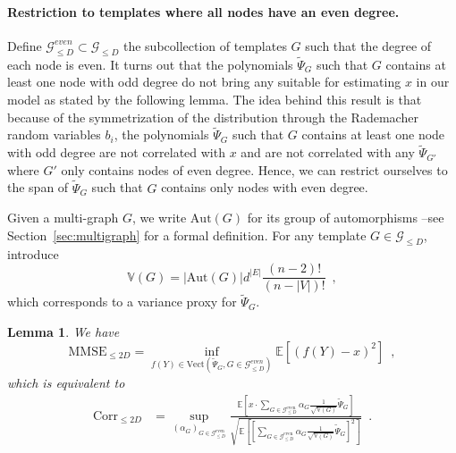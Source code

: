 \documentclass{article}
\newtheorem{lemma}{Lemma}
\begin{document}
\paragraph{Restriction to templates where all nodes have an even degree.}  


Define $\mathcal{G}_{\leq D}^{even}\subset \mathcal{G}_{\leq D}$ the subcollection of templates $G$ such that the degree of each  node is even. It turns out that the polynomials $\widetilde{\Psi}_{G}$ such that $G$ contains at least one node with odd degree do not bring any suitable for estimating $x$ in our model as stated by the following lemma. The idea behind this result is that because of the symmetrization of the distribution through the Rademacher random variables $b_i$, the polynomials $\widetilde{\Psi}_{G}$ such that $G$ contains at least one node with odd degree are not correlated with $x$ and are not correlated with any $\widetilde{\Psi}_{G'}$ where $G'$ only contains  nodes of even degree. Hence, we can restrict ourselves to the span of $\widetilde{\Psi}_{G}$ such that $G$ contains only nodes with even degree.

 Given a multi-graph $G$, we write $\mathrm{Aut}(G)$ for its group of automorphisms --see Section~\ref{sec:multigraph} for a formal definition. 
 For any template $G\in \mathcal{G}_{\leq D}$, introduce
\begin{equation}\label{eq:definition:V(G)}
\mathbb{V}(G)= |\mathrm{Aut}(G)| d^{|E|}\frac{(n-2)!}{(n-|V|)!}\enspace , 
\end{equation}
which corresponds to a variance proxy for $\widetilde{\Psi}_{G}$.


\begin{lemma}\label{lem:reduction:degree_pair}
We have 
\[
\mathrm{MMSE}_{\leq 2D}= \inf_{f(Y)\in \mathrm{Vect}(\widetilde{\Psi}_{G}, G \in \mathcal{G}_{\leq D}^{even})}\mathbb{E}[(f(Y)-x)^2]\enspace ,
\]
which is equivalent to
\begin{align*}
    \mathrm{Corr}_{\leq 2D} &= \sup_{(\alpha_G)_{G\in \mathcal G^{\mathrm{even}}_{\leq D}}} \frac{\mathbb E\left[x \cdot \sum_{G \in \mathcal G^{\mathrm{even}}_{\leq D}} \alpha_G \frac{1}{\sqrt{\mathbb V(G)}}\widetilde{\Psi}_{G}\right]}{\sqrt{\mathbb E\left[\left[\sum_{G\in \mathcal G^{\mathrm{even}}_{\leq D}} \alpha_G \frac{1}{\sqrt{\mathbb V(G)}}\widetilde{\Psi}_{G}\right]^2\right]}}\enspace .
\end{align*}
\end{lemma}
\end{document}

